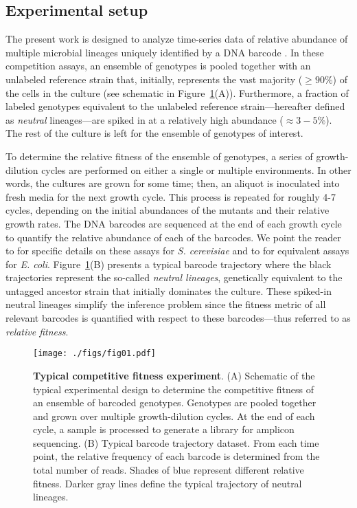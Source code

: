 \documentclass[
]{scrartcl}
\begin{document}
\begin{refsegment}
\hypertarget{sec-experiment}{%
\subsection{Experimental setup}\label{sec-experiment}}

The present work is designed to analyze time-series data of relative
abundance of multiple microbial lineages uniquely identified by a DNA
barcode \autocite{kinsler2020,ascensao2023}. In these competition
assays, an ensemble of genotypes is pooled together with an unlabeled
reference strain that, initially, represents the vast majority
(\(\geq 90\%\)) of the cells in the culture (see schematic in
Figure~\ref{fig-01}(A)). Furthermore, a fraction of labeled genotypes
equivalent to the unlabeled reference strain---hereafter defined as
\emph{neutral} lineages---are spiked in at a relatively high abundance
(\(\approx 3-5\%\)). The rest of the culture is left for the ensemble of
genotypes of interest.

To determine the relative fitness of the ensemble of genotypes, a series
of growth-dilution cycles are performed on either a single or multiple
environments. In other words, the cultures are grown for some time;
then, an aliquot is inoculated into fresh media for the next growth
cycle. This process is repeated for roughly 4-7 cycles, depending on the
initial abundances of the mutants and their relative growth rates. The
DNA barcodes are sequenced at the end of each growth cycle to quantify
the relative abundance of each of the barcodes. We point the reader to
\textcite{kinsler2020} for specific details on these assays for \emph{S.
cerevisiae} and to \textcite{ascensao2023} for equivalent assays for
\emph{E. coli}. Figure~\ref{fig-01}(B) presents a typical barcode
trajectory where the black trajectories represent the so-called
\emph{neutral lineages}, genetically equivalent to the untagged ancestor
strain that initially dominates the culture. These spiked-in neutral
lineages simplify the inference problem since the fitness metric of all
relevant barcodes is quantified with respect to these barcodes---thus
referred to as \emph{relative fitness}.

\begin{figure}

{\centering \texttt{[image: ./figs/fig01.pdf]}

}

\caption{\label{fig-01}\textbf{Typical competitive fitness experiment}.
(A) Schematic of the typical experimental design to determine the
competitive fitness of an ensemble of barcoded genotypes. Genotypes are
pooled together and grown over multiple growth-dilution cycles. At the
end of each cycle, a sample is processed to generate a library for
amplicon sequencing. (B) Typical barcode trajectory dataset. From each
time point, the relative frequency of each barcode is determined from
the total number of reads. Shades of blue represent different relative
fitness. Darker gray lines define the typical trajectory of neutral
lineages.}


\end{figure}
\end{refsegment}
\end{document}
